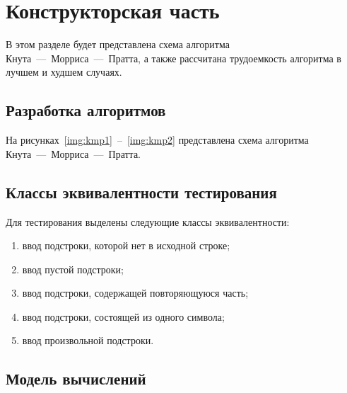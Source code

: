 \chapter{Конструкторская часть}

В этом разделе будет представлена схема алгоритма Кнута~---~Морриса~---~Пратта, а также рассчитана трудоемкость алгоритма в лучшем и худшем случаях.

\section{Разработка алгоритмов}

На рисунках~\ref{img:kmp1}~--~\ref{img:kmp2} представлена схема алгоритма Кнута~---~Морриса~---~Пратта. 



\newpage
\section{Классы эквивалентности тестирования}

Для тестирования выделены следующие классы эквивалентности:
\begin{enumerate}
	\item ввод подстроки, которой нет в исходной строке;
	\item ввод пустой подстроки;
	\item ввод подстроки, содержащей повторяющуюся часть;
	\item ввод подстроки, состоящей из одного символа;
	\item ввод произвольной подстроки.
\end{enumerate}

\section{Модель вычислений}

